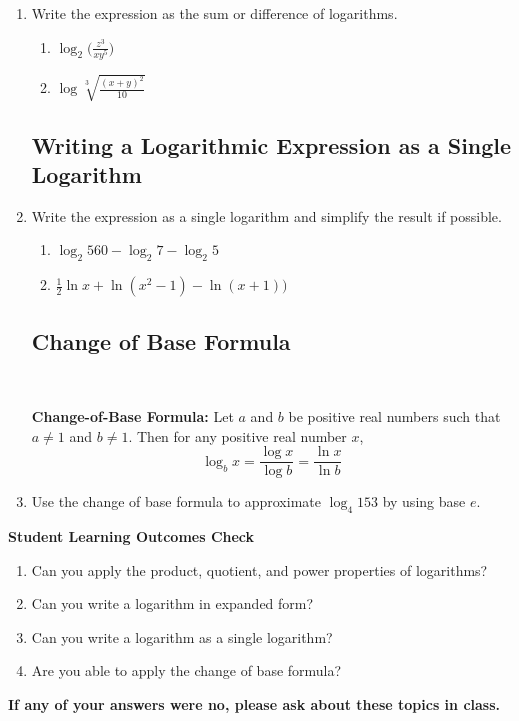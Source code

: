 \begin{enumerate}
\item Write the expression as the sum or difference of logarithms.
\begin{enumerate}
\item $\displaystyle \log_2 \Bigg(\frac{z^3}{xy^5}\Bigg)$\vfill
\item $\displaystyle \log \sqrt[3]{\frac{(x+y)^2}{10}}$\vfill
\end{enumerate}

\newpage

\subsection{Writing a Logarithmic Expression as a Single Logarithm}

\item Write the expression as a single logarithm and simplify the result if possible.
\begin{enumerate}
\item $\log_2 560 - \log_2 7- \log_2 5$\\[1.5in]
\item $\frac{1}{2} \ln x + \ln (x^2-1)- \ln(x+1))$\\[1.5in]
\end{enumerate}



\subsection{Change of Base Formula} ~

\noindent \textbf{Change-of-Base Formula: } Let $a$ and $b$ be positive real numbers such that $a \neq 1$ and $b \neq 1.$  Then for any positive real number $x$,
$$\log_b x=\frac{\log x}{\log b}=\frac{\ln x}{\ln b}$$


\item Use the change of base formula to approximate $\log_4 153$ by using base $e$.\vfill

\end{enumerate}

\noindent \textbf{Student Learning Outcomes Check}

\begin{enumerate}
\item Can you apply the product, quotient, and power properties of logarithms?
\item Can you write a logarithm in expanded form?
\item Can you write a logarithm as a single logarithm?
\item Are you able to apply the change of base formula?
\end{enumerate}

\noindent \textbf{If any of your answers were no, please ask about these topics in class.}


